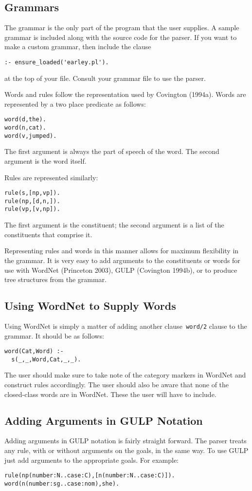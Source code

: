 \documentclass[12pt]{article}
\begin{document}
\subsection{Grammars}
The grammar is the only part of the program that the user supplies.  A sample grammar is included along with the source code for the parser.  If you want to make a custom grammar, then include the clause \begin{verbatim}:- ensure_loaded('earley.pl').\end{verbatim} at the top of your file.  Consult your grammar file to use the parser.

Words and rules follow the representation used by Covington (1994a).  Words are represented by a two place predicate as follows:
\begin{verbatim}
word(d,the).
word(n,cat).
word(v,jumped).
\end{verbatim}
The first argument is always the part of speech of the word.  The second argument is the word itself.

Rules are represented similarly:
\begin{verbatim}
rule(s,[np,vp]).
rule(np,[d,n,]).
rule(vp,[v,np]).
\end{verbatim}
The first argument is the constituent; the second argument is a list of the constituents that comprise it.

Representing rules and words in this manner allows for maximum flexibility in the grammar. It is very easy to add arguments to the constituents or words for use with WordNet (Princeton 2003), GULP (Covington 1994b), or to produce tree structures from the grammar.

\subsection{Using WordNet to Supply Words}
Using WordNet is simply a matter of adding another clause\verb| word/2| clause to the grammar. It should be as follows:
\begin{verbatim}
word(Cat,Word) :-
  s(_,_,Word,Cat,_,_).
\end{verbatim}

The user should make sure to take note of the category markers in WordNet and construct rules accordingly. The user should also be aware that none of the closed-class words are in WordNet.  These the user will have to include.

\subsection{Adding Arguments in GULP Notation}
Adding arguments in GULP notation is fairly straight forward.  The parser treats any rule, with or without arguments on the goals, in the same way. To use GULP just add arguments to the appropriate goals.  For example:
\begin{verbatim}
rule(np(number:N..case:C),[n(number:N..case:C)]).
word(n(number:sg..case:nom),she).
\end{verbatim}
\end{document}
